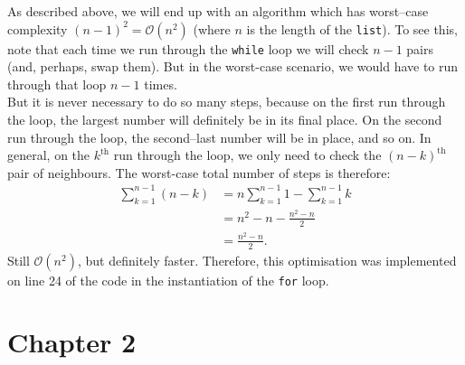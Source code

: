 \documentclass{report}
\begin{document}
As described above, we will end up with an algorithm which has worst--case complexity $\left(n-1\right)^2=\mathcal{O}\left(n^2\right)$ (where $n$ is the length of the \verb|list|). To see this, note that each time we run through the \verb|while| loop we will check $n-1$ pairs (and, perhaps, swap them). But in the worst-case scenario, we would have to run through that loop $n-1$ times.\\
\indent But it is never necessary to do so many steps, because on the first run through the loop, the largest number will definitely be in its final place. On the second run through the loop, the second--last number will be in place, and so on. In general, on the $k^{\text{th}}$ run through the loop, we only need to check the $(n-k)^{\text{th}}$ pair of neighbours. The worst-case total number of steps is therefore:
\begin{align}
\sum_{k=1}^{n-1}\left(n-k\right)&=n\sum_{k=1}^{n-1}1-\sum_{k=1}^{n-1}k\nonumber\\
&=n^2-n-\frac{n^2-n}{2}\\
&=\frac{n^2-n}{2}.\nonumber
\end{align}
Still $\mathcal{O}\left(n^2\right)$, but definitely faster. Therefore, this optimisation was implemented on line 24 of the code in the instantiation of the \verb|for| loop.
\chapter*{Chapter 2} %
\end{document}
